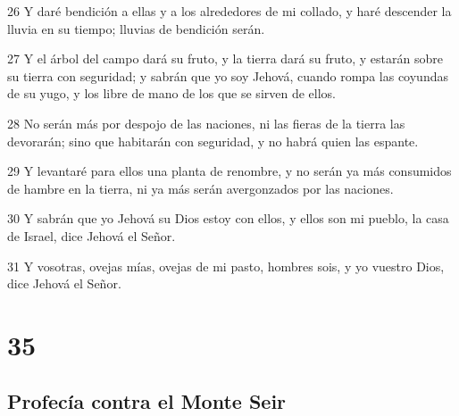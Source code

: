 \par 26 Y daré bendición a ellas y a los alrededores de mi collado, y haré descender la lluvia en su tiempo; lluvias de bendición serán.
\par 27 Y el árbol del campo dará su fruto, y la tierra dará su fruto, y estarán sobre su tierra con seguridad; y sabrán que yo soy Jehová, cuando rompa las coyundas de su yugo, y los libre de mano de los que se sirven de ellos.
\par 28 No serán más por despojo de las naciones, ni las fieras de la tierra las devorarán; sino que habitarán con seguridad, y no habrá quien las espante.
\par 29 Y levantaré para ellos una planta de renombre, y no serán ya más consumidos de hambre en la tierra, ni ya más serán avergonzados por las naciones.
\par 30 Y sabrán que yo Jehová su Dios estoy con ellos, y ellos son mi pueblo, la casa de Israel, dice Jehová el Señor.
\par 31 Y vosotras, ovejas mías, ovejas de mi pasto, hombres sois, y yo vuestro Dios, dice Jehová el Señor.

\chapter{35}

\section*{Profecía contra el Monte Seir}

